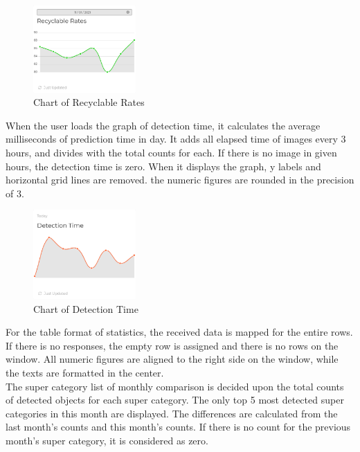 \documentclass[conference]{IEEEtran}
\begin{document}
\begin{figure}[h]
    \centering
    \includegraphics[width=0.35\textwidth]{images/dashboard_rec_chart.eps}
    \caption{Chart of Recyclable Rates}
\end{figure}

When the user loads the graph of detection time, it calculates the average milliseconds of prediction time in day. It adds all elapsed time of images every 3 hours, and divides with the total counts for each. If there is no image in given hours, the detection time is zero. When it displays the graph, y labels and horizontal grid lines are removed. the numeric figures are rounded in the precision of 3.\\

\begin{figure}[h]
    \centering
    \includegraphics[width=0.35\textwidth]{images/dashboard_time_chart.eps}
    \caption{Chart of Detection Time}
\end{figure}

For the table format of statistics, the received data is mapped for the entire rows. If there is no responses, the empty row is assigned and there is no rows on the window. All numeric figures are aligned to the right side on the window, while the texts are formatted in the center.\\

The super category list of monthly comparison is decided upon the total counts of detected objects for each super category. The only top 5 most detected super categories in this month are displayed. The differences are calculated from the last month's counts and this month's counts. If there is no count for the previous month's super category, it is considered as zero.\\
\end{document}
